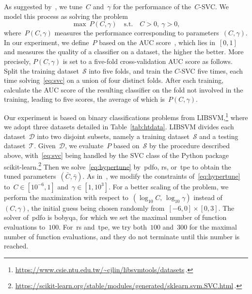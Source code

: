 \documentclass[
    smallextended,  %
    final,          %
]{svjour3}
\newcommand{\st}{\text{s.t.}}
\begin{document}
As suggested by~\cite[\S~9]{Chang_Lin_2011}, we tune~$C$ and~$\gamma$ for the performance of
the~$C$-SVC.
We model this process as solving the problem
\begin{equation}
    \label{eq:hypertune}
    \max ~ P(C, \gamma) \quad \st \quad C > 0,~ \gamma > 0,
\end{equation}
where~$P(C, \gamma)$ measures the performance corresponding to parameters~$(C, \gamma)$. In our experiment,
we define~$P$ based on the AUC score~\cite[\S~3]{Ghanbari_Scheinberg_2017}, which lies in~$[0,1]$
and measures the quality of a classifier on a dataset, the higher the better.
More precisely, $P(C, \gamma)$ is set to a five-fold cross-validation AUC score as follows.
Split the training dataset~$\mathcal{S}$ into five folds, and train the $C$-SVC five times, each time
solving~\eqref{eq:svc} on a union
of four distinct folds. After each training, calculate the AUC score of the resulting classifier
on the fold not involved in the training, leading to five scores, the average of which is~$P(C, \gamma)$.



Our experiment is based on binary classifications problems from \mbox{LIBSVM},\footnote{\url{https://www.csie.ntu.edu.tw/~cjlin/libsvmtools/datasets}\,.}
where we adopt three datasets detailed in Table~\ref{tab:htdata}.
LIBSVM divides each dataset~$\mathcal{D}$ into two disjoint subsets, namely a training dataset~$\mathcal{S}$ and
a testing dataset~$\mathcal{T}$.
Given~$\mathcal{D}$, we evaluate~$P$ based on~$\mathcal{S}$ by the procedure
described above, with~\eqref{eq:svc} being handled by the SVC class of the Python package
\mbox{scikit-learn}.\footnote{\url{https://scikit-learn.org/stable/modules/generated/sklearn.svm.SVC.html}\,.}
Then we solve~\eqref{eq:hypertune} by~\gls{pdfo}, \gls{rs}, or~\gls{tpe} to obtain the tuned
parameters~$(\bar{C}, \bar{\gamma})$.
As in~\cite[\S~5.3]{Ghanbari_Scheinberg_2017}, we modify the constraints of~\eqref{eq:hypertune}
to~$C\in[10^{-6}, 1]$ and~$\gamma\in [1, 10^{3}]$. For a better scaling of the problem,
we perform the maximization with respect to~$(\log_{10}C,\, \log_{10}\gamma)$ instead of~$(C,
\gamma)$, the initial guess being chosen randomly from~$[-6, 0]\times[0, 3]$. The solver
of~\gls{pdfo} is \gls{bobyqa}, for which we set the maximal number of function evaluations to~$100$.
For~\gls{rs} and~\gls{tpe}, we try both~$100$ and~$300$ for the maximal number of function
evaluations, and they do not terminate until this number is reached.
\end{document}
